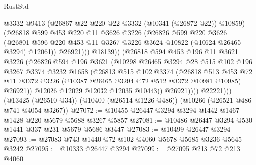 \begin{lexlean}{RustStd}
\begin{coremodule}
{\begin{coremodule}
{{{{{{{{{{{{{{{{{{{{{{{{{                        @3332
                        @9413
                        (@26867 @22 @220 @22 @3332 (@10341 (@26872 @22)) @10859)
                        (@26818
                          @599
                          @453
                          @220
                          @11
                          @3626
                          @3226
                          (@26826
                            @599
                            @220
                            @3626
                            (@26801
                              @596
                              @220
                              @453
                              @11
                              @3267
                              @3226
                              @3624
                              @10822
                              (@10624 @26465 @3294)
                              @12061))
                          @26921)))
                    @18139))
                (@26818
                  @594
                  @453
                  @196
                  @11
                  @3621
                  @3226
                  (@26826
                    @594
                    @196
                    @3621
                    (@10298
                      @26465
                      @3294
                      @28
                      @515
                      @102
                      @196
                      @3267
                      @3374
                      @3232
                      @1658
                      (@26813
                        @515
                        @102
                        @3374
                        (@26818
                          @513
                          @453
                          @72
                          @11
                          @3372
                          @3226
                          (@10387 @26465 @3294 @72 @512 @3372 @10981 @10985)
                          @26921))
                      @12026
                      @12029
                      @12032
                      @12035
                      @10443))
                  @26921))))
          @22221)))
    (@13425 (@26510 @34))
    (@10400 (@26514 @1226 @486))
    (@10266 (@26521 @486 @741 @4054 @3267))
@27072 := @10455 @26447 @3294 @3294 @1442 @1467 @1428 @220 @5679 @5688 @3267 @5857
@27081 := @10486 @26447 @3294 @530 @1441 @337 @231 @5679 @5686 @3447
@27083 := @10499 @26447 @3294
@27093 := @27083 @743 @1440 @72 @102 @4060 @5678 @5685 @3236 @5645 @3242
@27095 := @10333 @26447 @3294
@27099 := @27095 @213 @72 @213 @4060
}}}}}}}}}}}}}}}}}}}}}}}}}
\end{coremodule}}
\end{coremodule}
\end{lexlean}
